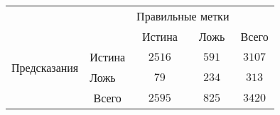 \begin{tabular}{l|l|c|c|c}
\multicolumn{2}{c}{}&\multicolumn{2}{c}{Правильные метки}&\\
\cline{3-4}
\multicolumn{2}{c|}{}&Истина&Ложь&\multicolumn{1}{c}{Всего}\\
\cline{2-4}
\multirow{2}{*}{Предсказания }& Истина & $ 2516 $ & $ 591 $ & $ 3107$\\
\cline{2-4}
& Ложь & $79$ & $234$ & $ 313 $\\
\cline{2-4}
\multicolumn{1}{c}{} & \multicolumn{1}{c}{Всего} & \multicolumn{1}{c}{$2595$} & \multicolumn{1}{c}{$825$} & \multicolumn{1}{c}{$3420$}\\
\end{tabular}

